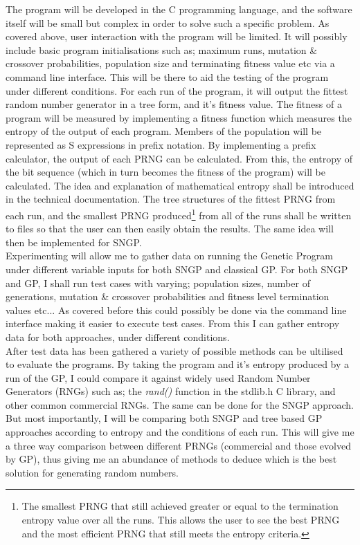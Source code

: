 \documentclass[a4paper,10.5pt]{article}
\begin{document}
The program will be developed in the C programming language, and the software itself will be small but complex in order to solve such a specific problem. As covered above, user interaction with the program will be limited. It will possibly include basic program initialisations such as; maximum runs, mutation \& crossover probabilities, population size and terminating fitness value etc via a command line interface. This will be there to aid the testing of the program under different conditions. For each run of the program, it will output the fittest random number generator in a tree form, and it's fitness value. The fitness of a program will be measured by implementing a fitness function which measures the entropy of the output of each program. Members of the population will be represented as S expressions in prefix notation. By implementing a prefix calculator, the output of each  PRNG can be calculated. From this, the entropy of the bit sequence (which in turn becomes the fitness of the program) will be calculated.
The idea and explanation of mathematical entropy shall be introduced in the technical documentation.  The tree structures of the fittest PRNG from each run, and the smallest PRNG produced\footnote{The smallest PRNG that still achieved greater or equal to the termination entropy value over all the runs. This allows the user to see the best PRNG and the most efficient PRNG that still meets the entropy criteria.} from all of the runs shall be written to files so that the user can then easily obtain the results. The same idea will then be implemented for SNGP.\\

Experimenting will allow me to gather data on running the Genetic Program under different variable inputs for both SNGP and classical GP. For both SNGP and GP, I shall run test cases with varying;  population sizes, number of generations, mutation \& crossover probabilities and fitness level termination values etc...  As covered before this could possibly be done via the command line interface making it easier to execute test cases. From this I can gather entropy data for both approaches, under different conditions.\\

After test data has been gathered a variety of possible methods can be ultilised to evaluate the programs. By taking the program and it's entropy produced by a run of the GP, I could compare it against widely used Random Number Generators (RNGs) such as; the \emph{rand()} function in the stdlib.h C library, and other common commercial RNGs. The same can be done for the SNGP approach. But most importantly, I will be comparing both SNGP and tree based GP approaches according to entropy and the conditions of each run. This will give me a three way comparison between different PRNGs (commercial and those evolved by GP), thus giving me an abundance of methods to deduce which is the best solution for generating random numbers.
\end{document}
